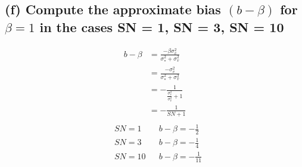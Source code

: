 \documentclass[12pt, a4paper]{article}
\begin{document}
\subsection*{(f) Compute the approximate bias $(b-\beta)$ for $\beta = 1$ in the cases SN = 1, SN = 3, SN = 10 }
\begin{align*}
    b - \beta &= \frac{-\beta \sigma_v^2}{\sigma_*^2+\sigma_v^2}\\
    &= \frac{-\sigma_v^2}{\sigma_*^2+\sigma_v^2}\\
    &= -\frac{1}{\frac{\sigma_*^2}{\sigma_v^2}+1}\\
    &= -\frac{1}{SN+1}\\
\end{align*}
\begin{align*}
    &SN = 1 &&b -\beta = -\frac{1}{2}\\
    &SN = 3 &&b -\beta = -\frac{1}{4}\\
    &SN = 10 &&b -\beta = -\frac{1}{11}\\
\end{align*}
\vspace{1em}
\end{document}
